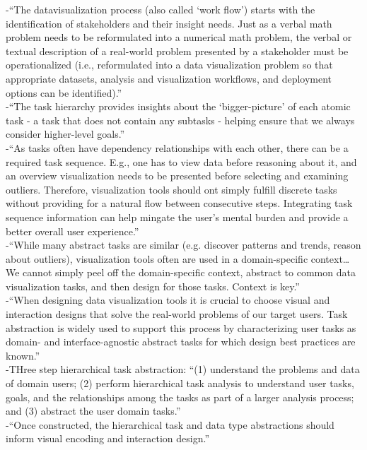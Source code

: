 -{\color{orange}“The datavisualization process (also called ‘work flow’) starts with the identification of stakeholders and their insight needs. Just as a verbal math problem needs to be reformulated into a numerical math problem, the verbal or textual description of a real-world problem presented by a stakeholder must be operationalized (i.e., reformulated into a data visualization problem so that appropriate datasets, analysis and visualization workflows, and deployment options can be identified).”\cite{Borner2019}}\\
-{\color{orange}“The task hierarchy provides insights about the ‘bigger-picture’ of each atomic task - a task that does not contain any subtasks - helping ensure that we always consider higher-level goals.”\cite{Zhang2019}}\\
-{\color{orange}“As tasks often have dependency relationships with  each other, there can be a required task sequence. E.g., one has to view data before reasoning about it, and an overview visualization needs to be presented before selecting and examining outliers. Therefore, visualization tools should ont simply fulfill discrete tasks without providing for a natural flow between consecutive steps. Integrating task sequence information can help mingate the user’s mental burden and provide a better overall user experience.”\cite{Zhang2019}}\\
-{\color{orange}“While many abstract tasks are similar (e.g. discover patterns and trends, reason about outliers), visualization tools often are used in a domain-specific context… We cannot simply peel off the domain-specific context, abstract to common data visualization tasks, and then design for those tasks. Context is key.”\cite{Zhang2019}}\\
-{\color{orange}“When designing data visualization tools it is crucial to choose visual and interaction designs that solve the real-world problems of our target users. Task abstraction is widely used to support this process by characterizing user tasks as domain- and interface-agnostic abstract tasks for which design best practices are known.”\cite{Zhang2019}}\\
-{\color{orange}THree step hierarchical task abstraction: “(1) understand the problems and data of domain users; (2) perform hierarchical task analysis to understand user tasks, goals, and the relationships among the tasks as part of a larger analysis process; and (3) abstract the user domain tasks.”\cite{Zhang2019}}\\
-{\color{orange}“Once constructed, the hierarchical task and data type abstractions should inform visual encoding and interaction design.”\cite{Zhang2019}}\\

